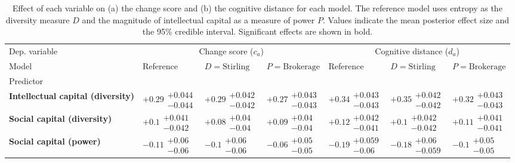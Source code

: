 \begin{table}[H]
\caption{Effect of each variable on (a) the change score and (b) the cognitive distance for each model. The reference model uses entropy as the diversity measure $D$ and the magnitude of intellectual capital as a measure of power $P$. Values indicate the mean posterior effect size and the 95\% credible interval. Significant effects are shown in bold.}
\label{table:summary_change_disruption}
\renewcommand{\arraystretch}{2}\fontsize{6}{7}\selectfont\begin{tabular}{lllllll}
\toprule
Dep. variable & \multicolumn{3}{c}{Change score ($c_a$)} & \multicolumn{3}{c}{Cognitive distance ($d_a$)} \\
Model & Reference & $D=\text{Stirling}$ & $P=\text{Brokerage}$ & Reference & $D=\text{Stirling}$ & $P=\text{Brokerage}$ \\
Predictor &  &  &  &  &  &  \\
\midrule
\textbf{Intellectual capital (diversity)} & $\bm{+0.29}\substack{+0.044 \\ -0.044}$ & $\bm{+0.29}\substack{+0.042 \\ -0.042}$ & $\bm{+0.27}\substack{+0.043 \\ -0.043}$ & $\bm{+0.34}\substack{+0.043 \\ -0.043}$ & $\bm{+0.35}\substack{+0.042 \\ -0.042}$ & $\bm{+0.32}\substack{+0.043 \\ -0.043}$ \\
\textbf{Social capital (diversity)} & $\bm{+0.1}\substack{+0.041 \\ -0.042}$ & $\bm{+0.08}\substack{+0.04 \\ -0.04}$ & $\bm{+0.09}\substack{+0.04 \\ -0.04}$ & $\bm{+0.12}\substack{+0.042 \\ -0.041}$ & $\bm{+0.1}\substack{+0.042 \\ -0.042}$ & $\bm{+0.11}\substack{+0.041 \\ -0.041}$ \\
\textbf{Social capital (power)} & $\bm{-0.11}\substack{+0.06 \\ -0.06}$ & $\bm{-0.1}\substack{+0.06 \\ -0.06}$ & $\bm{-0.06}\substack{+0.05 \\ -0.05}$ & $\bm{-0.19}\substack{+0.059 \\ -0.06}$ & $\bm{-0.18}\substack{+0.06 \\ -0.059}$ & $\bm{-0.1}\substack{+0.05 \\ -0.05}$ \\

\end{tabular}
\end{table}

